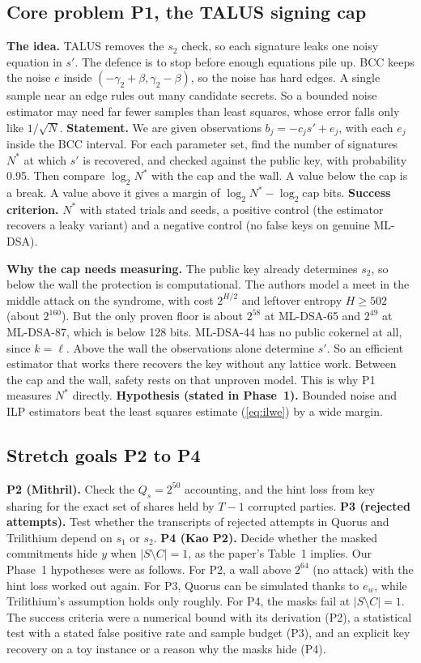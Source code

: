\documentclass[10pt,conference,a4paper]{IEEEtran}
\begin{document}
\subsection{Core problem P1, the TALUS signing cap}
\textbf{The idea.} TALUS removes the $s_2$ check, so each signature leaks one noisy equation in $s'$. The defence is to stop
before enough equations pile up. BCC keeps the noise $e$ inside $(-\gamma_2+\beta,\gamma_2-\beta)$, so the noise has hard
edges. A single sample near an edge rules out many candidate secrets. So a bounded noise estimator may need far fewer
samples than least squares, whose error falls only like $1/\sqrt N$. \textbf{Statement.} We are given observations
$b_j=-c_js'+e_j$, with each $e_j$ inside the BCC interval. For each parameter set, find the number of signatures $N^*$ at
which $s'$ is recovered, and checked against the public key, with probability 0.95. Then compare $\log_2N^*$ with the cap
and the wall. A value below the cap is a break. A value above it gives a margin of $\log_2N^*-\log_2\text{cap}$ bits.
\textbf{Success criterion.} $N^*$ with stated trials and seeds, a positive control (the estimator recovers a leaky
variant) and a negative control (no false keys on genuine ML-DSA).

\textbf{Why the cap needs measuring.} The public key already determines $s_2$, so below the wall the protection is
computational. The authors model a meet in the middle attack on the syndrome, with cost $2^{H/2}$ and leftover entropy
$H\ge502$ (about $2^{160}$). But the only proven floor is about $2^{58}$ at ML-DSA-65 and $2^{49}$ at ML-DSA-87, which is
below 128 bits. ML-DSA-44 has no public cokernel at all, since $k=\ell$. Above the wall the observations alone determine
$s'$. So an efficient estimator that works there recovers the key without any lattice work. Between the cap and the wall,
safety rests on that unproven model. This is why P1 measures $N^*$ directly. \textbf{Hypothesis (stated in Phase~1).}
Bounded noise and ILP estimators beat the least squares estimate (\ref{eq:ilwe}) by a wide margin.

\subsection{Stretch goals P2 to P4}
\textbf{P2 (Mithril).} Check the $Q_s=2^{50}$ accounting, and the hint loss from key sharing for the exact set of shares
held by $T-1$ corrupted parties. \textbf{P3 (rejected attempts).} Test whether the transcripts of rejected attempts in
Quorus and Trilithium depend on $s_1$ or $s_2$. \textbf{P4 (Kao P2).} Decide whether the masked commitments hide $y$ when
$|S\setminus C|=1$, as the paper's Table~1 implies. Our Phase~1 hypotheses were as follows. For P2, a wall above $2^{64}$
(no attack) with the hint loss worked out again. For P3, Quorus can be simulated thanks to $e_w$, while Trilithium's
assumption holds only roughly. For P4, the masks fail at $|S\setminus C|=1$. The success criteria were a numerical bound
with its derivation (P2), a statistical test with a stated false positive rate and sample budget (P3), and an explicit key
recovery on a toy instance or a reason why the masks hide (P4).
\end{document}
